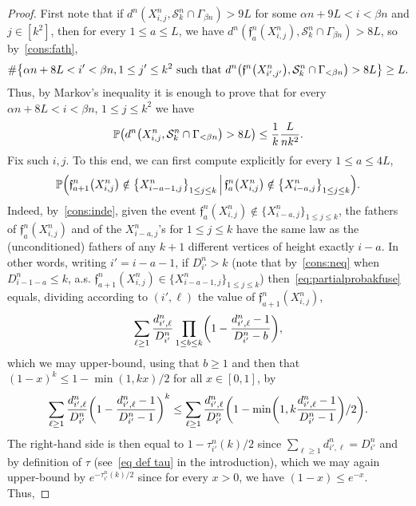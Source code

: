 \documentclass[10pt]{amsart}
\theoremstyle{definition}\newtheorem{defi}[theo]{Definition}\newtheorem{rema}[theo]{Remark}\newtheorem{exam}[theo]{Example}\newtheorem{exem}[theo]{Example}\newtheorem{nota}[theo]{Notation}
\newcommand{\proba}[1]{\mathbb{P}\left(#1\right)}
\newcommand{\1}{\mathbbm{1}}
\newcommand{\fath}{\mathfrak{f}}
\newcommand{\trail}{\mathcal{S}}
\let\originalleft\left
\let\originalright\right
\renewcommand{\left}{\mathopen{}\mathclose\bgroup\originalleft}
\renewcommand{\right}{\aftergroup\egroup\originalright}
\begin{document}
\begin{proof}
First note that if $d^n(X^n_{i,j},\trail^n_k \cap \Gamma_{\beta n})>9L$ for some $\alpha n +9L <i < \beta n$ and $j \in [k^2]$, then for every $1\leq a \leq L$, we have $d^n(\fath^n_a(X^n_{i,j}),\trail^n_k \cap \Gamma_{\beta n})>8L$, so by~\ref{cons:fath},
\[
\#\left\{\alpha n+8L<i'<\beta n,1\leq j'\leq k^2 \text{ such that } d^n\left(\fath^n\left(X^n_{i',j'}\right),\trail^n_k \cap \Gamma_{<\beta n}\right)>8L\right\}\geq L.
\]
Thus, by Markov's inequality it is enough to prove that for every $\alpha n+8L<i<\beta n$, $1\leq j\leq k^2$ we have
\begin{equation}\label{eq:half_lem:chain}
\proba{d^n\left(X^n_{i,j},\trail^n_k \cap \Gamma_{<\beta n}\right)>8L}\leq \frac{1}{k} \frac{L}{nk^2}
.
\end{equation}
Fix such $i,j$. To this end, we can first compute explicitly for every $1\leq a\leq 4L$,
\begin{equation}\label{eq:partialprobakfuse}
\proba{\fath^n_{a+1}\left(X^n_{i,j}\right) \notin \left\{X^n_{i-a-1,j}\right\}_{1\leq j \leq k} \,\middle|\,\fath^n_{a}\left(X^n_{i,j}\right) \notin \left\{X^n_{i-a,j}\right\}_{1\leq j \leq k}}. 
\end{equation}
Indeed, by~\ref{cons:inde}, given the event $\fath^n_{a}(X^n_{i,j}) \notin \{X^n_{i-a,j}\}_{1\leq j \leq k}$, the fathers of $\fath^n_{a}(X^n_{i,j})$ and of the $X^n_{i-a,j}$'s for ${1\leq j \leq k}$ have the same law as the (unconditioned) father{s} of any $k+1$ different vertices of height exactly $i-a$. In other words, writing $i'=i-a-1$, if $D_{i'}^n>k$ (note that by~\ref{cons:neq} when $D^n_{i-1-a}\leq k$, a.s. $\fath^n_{a+1}(X^n_{i,j})\in \{X^n_{i-a-1,j}\}_{1\leq j \leq k}$) then~\eqref{eq:partialprobakfuse} equals, dividing according to $({i',\ell})$ the value of $\fath^n_{a+1}(X^n_{i,j})$,
\[
\sum_{\ell\ge 1} \frac{d_{i',\ell}^n}{D_{i'}^n} \prod_{1\leq b\leq k}\left (1-\frac{d_{i',\ell}^n-1}{D_{i'}^n-b}\right),
\]
which we may upper-bound, using that $b\geq 1$ and then that $(1-x)^k\leq 1-\min(1,kx)/2$ for all $x \in [0,1]$, by
\[
\sum_{\ell\ge 1} \frac{d_{i',\ell}^n}{D_{i'}^n} \left(1-\frac{d_{i',\ell}^n-1}{D_{i'}^n-1}\right)^k \leq \sum_{\ell\ge 1} \frac{d_{i',\ell}^n}{D_{i'}^n}\left (1-\min\left (1,k\frac{d_{i',\ell}^n-1}{D_{i'}^n-1} \right)/2\right).
\]
The right-hand side is then equal to $1-\tau_{i'}^n(k)/2$ since $\sum_{\ell\ge1} d_{i',\ell}^n=D_{i'}^n$ and by definition of $\tau$ (see~\eqref{eq def tau} in the introduction), which we may again upper-bound by $e^{-\tau_{i'}^n(k)/2}$ since for every $x>0$, we have $(1-x)\leq e^{-x}$. Thus,

\end{proof}
\end{document}
